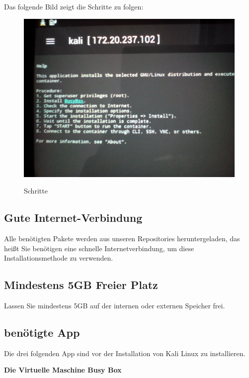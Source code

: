 \documentclass[11pt,a4paper]{article}
\begin{document}
Das folgende Bild zeigt die Schritte zu folgen: \\

\begin{figure}[!h]
\begin{center} \includegraphics[scale=0.09]{./Image/img1}  \\
\caption{Schritte}
\end{center}
\end{figure}


\subsection{Gute Internet-Verbindung}
Alle benötigten Pakete werden aus unseren Repositories heruntergeladen, das heißt Sie benötigen eine schnelle Internetverbindung, um diese Installationsmethode zu verwenden. \\

\subsection{Mindestens 5GB  Freier Platz}
Lassen Sie mindestens 5GB auf der internen oder externen Speicher frei. 

  
 \subsection{benötigte App}  
 
Die drei folgenden App sind vor der Installation von Kali Linux zu installieren.

 \textbf{Die Virtuelle Maschine Busy Box}  \\ 
 
\end{document}
